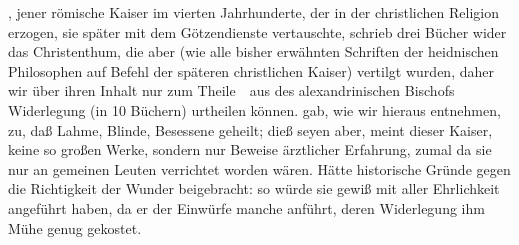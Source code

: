 \begin{aufza}
\begin{aufzb}
\item {}, jener römische Kaiser im vierten Jahrhunderte, der in der christlichen Religion erzogen, sie später mit dem Götzendienste vertauschte, schrieb drei Bücher wider das Christenthum, die aber (wie alle bisher erwähnten Schriften der heidnischen Philosophen auf Befehl der späteren christlichen Kaiser) vertilgt wurden, daher wir über ihren Inhalt nur zum Theile~\ aus des alexandrinischen Bischofs  Widerlegung (in 10 Büchern) urtheilen können.  gab, wie wir hieraus entnehmen, zu, daß  Lahme, Blinde, Besessene geheilt; dieß seyen aber, meint dieser Kaiser, keine so großen Werke, sondern nur Beweise ärztlicher Erfahrung, zumal da sie nur an gemeinen Leuten verrichtet worden wären. Hätte  historische Gründe gegen die Richtigkeit der Wunder  beigebracht: so würde  sie gewiß mit aller Ehrlichkeit angeführt haben, da er der Einwürfe manche anführt, deren Widerlegung ihm Mühe genug gekostet.
\end{aufzb}
\end{aufza}

